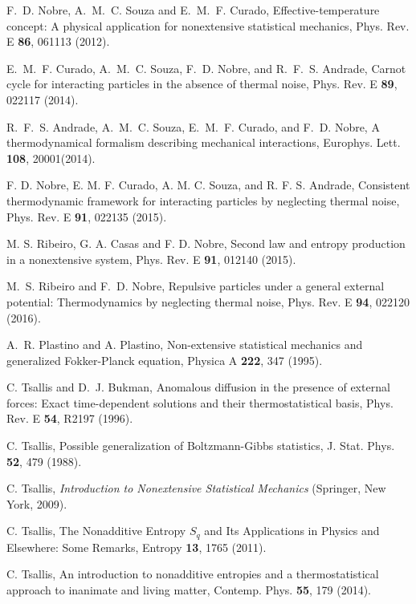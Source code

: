 \documentclass[showpacs,preprintnumbers,amsmath,amssymb,eqsecnum]{revtex4}
\begin{document}
\begin{thebibliography}{99}
F.~D. Nobre, A.~M.~C. Souza and E.~M.~F. Curado,
Effective-temperature concept: A physical application for
nonextensive statistical mechanics,
Phys. Rev. E \textbf{86}, 061113 (2012).

E.~M.~F. Curado, A.~M.~C. Souza, F.~D. Nobre,
and R.~F.~S. Andrade, Carnot cycle for interacting particles in the absence of
thermal noise, Phys. Rev. E {\bf 89}, 022117 (2014).

R.~F.~S. Andrade, A.~M.~C. Souza, E.~M.~F. Curado, and
F.~D. Nobre, A thermodynamical formalism describing
mechanical interactions, Europhys. Lett. {\bf 108}, 20001(2014).

F. D. Nobre, E. M. F. Curado, A. M. C. Souza, and R. F. S.
Andrade, Consistent thermodynamic framework for interacting particles by
neglecting thermal noise, Phys. Rev. E \textbf{91}, 022135 (2015).

M. S. Ribeiro, G. A. Casas and F. D. Nobre, Second law and entropy production
in a nonextensive system, Phys. Rev. E \textbf{91}, 012140 (2015).

M.~S. Ribeiro and F.~D. Nobre,
Repulsive particles under a general external potential:
Thermodynamics by neglecting thermal noise,
Phys. Rev. E {\bf 94}, 022120 (2016).

A.~R. Plastino and A. Plastino, Non-extensive statistical mechanics and
generalized Fokker-Planck equation, Physica A \textbf{222},
347 (1995).

C. Tsallis and D.~J. Bukman, Anomalous diffusion in the presence of external
forces: Exact time-dependent solutions and their thermostatistical basis,
Phys. Rev. E \textbf{54}, R2197 (1996).

C. Tsallis, Possible generalization of Boltzmann-Gibbs statistics,
J. Stat. Phys. {\bf 52}, 479 (1988).

C. Tsallis, {\it Introduction to Nonextensive Statistical Mechanics}
(Springer, New York, 2009).

C. Tsallis, The Nonadditive Entropy $S_{q}$ and Its Applications in Physics
and Elsewhere: Some Remarks, Entropy {\bf 13}, 1765 (2011).

C. Tsallis, An introduction to nonadditive entropies and a thermostatistical
approach to inanimate and living matter, Contemp. Phys. {\bf 55}, 179 (2014).


\end{thebibliography}
\end{document}
